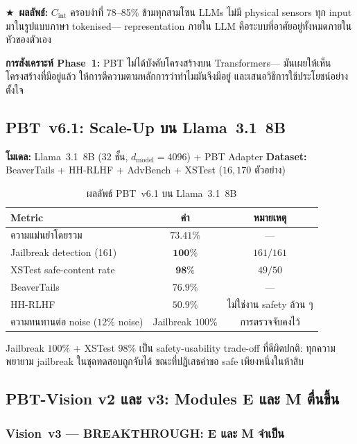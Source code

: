 \documentclass[12pt,a4paper]{article}
\newcommand{\Cint}{C_{\mathrm{int}}}
\newcommand{\starred}{\textbf{\textcolor{pbtblue}{$\bigstar$}}~}
\begin{document}
\starred\textbf{ผลลัพธ์:} $\Cint$ ครอบงำที่ 78--85\% ข้ามทุกสามโซน
LLMs ไม่มี physical sensors ทุก input มาในรูปแบบภาษา tokenised---
representation ภายใน LLM คือระบบที่อาศัยอยู่ทั้งหมดภายในหัวของตัวเอง

\textbf{การสังเคราะห์ Phase~1:} PBT ไม่ได้บังคับโครงสร้างบน Transformers---
มันเผยให้เห็นโครงสร้างที่มีอยู่แล้ว ให้การตีความตามหลักการว่าทำไมมันจึงมีอยู่
และเสนอวิธีการใช้ประโยชน์อย่างตั้งใจ

\subsection{PBT~v6.1: Scale-Up บน Llama~3.1~8B}

\textbf{โมเดล:} Llama~3.1~8B \citep{touvron2023} (32 ชั้น,
$d_{\mathrm{model}} = 4096$) + PBT Adapter
\textbf{Dataset:} BeaverTails + HH-RLHF + AdvBench + XSTest ($16{,}170$ ตัวอย่าง)

\begin{table}[!htbp]
\centering
\caption{ผลลัพธ์ PBT~v6.1 บน Llama~3.1~8B}
\label{tab:v61}
\small
\begin{tabular}{@{}lcc@{}}
\toprule
\textbf{Metric} & \textbf{ค่า} & \textbf{หมายเหตุ} \\
\midrule
ความแม่นยำโดยรวม              & $73.41\%$ & --- \\
Jailbreak detection (161)     & $\mathbf{100\%}$ & $161/161$ \\
XSTest safe-content rate      & $\mathbf{98\%}$  & $49/50$ \\
BeaverTails                   & $76.9\%$ & --- \\
HH-RLHF                       & $50.9\%$ & ไม่ใช่งาน safety ล้วน ๆ \\
ความทนทานต่อ noise ($12\%$ noise) & Jailbreak $100\%$ & การตรวจจับคงไว้ \\
\bottomrule
\end{tabular}
\end{table}

Jailbreak $100\%$ + XSTest $98\%$ เป็น safety-usability trade-off
ที่ดีผิดปกติ: ทุกความพยายาม jailbreak ในชุดทดสอบถูกจับได้
ขณะที่ปฏิเสธคำขอ safe เพียงหนึ่งในห้าสิบ

\subsection{PBT-Vision v2 และ v3: Modules E และ M ตื่นขึ้น}

\subsubsection{Vision~v3 --- BREAKTHROUGH: E และ M จำเป็น}
\end{document}
